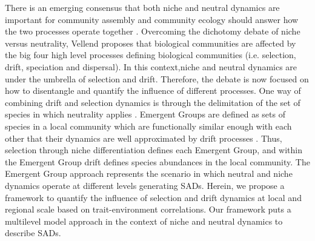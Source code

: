 \documentclass[12pt]{article}
\begin{document}
There is an emerging consensus that both niche and neutral dynamics are important for community assembly \citep{Vellend2014} and community ecology should answer how the two processes operate together \citep{Gravel2006, Herault2007, Ovaskainen2017}. Overcoming the dichotomy debate of niche versus neutrality, Vellend proposes that biological communities are affected by the big four high level processes defining biological communities (i.e. selection, drift, speciation and dispersal). In this context,niche and neutral dynamics are under the umbrella of selection and drift. Therefore, the debate is now focused on how to disentangle and quantify the influence of different processes. %
One way of combining drift and selection dynamics is through the delimitation 
of the set of species in which neutrality applies \citep{Tilman2004, Scheffer2006, Herault2007, Holt2007}. Emergent Groups are defined as sets of species in a local community which are functionally similar enough with each other that their dynamics are well approximated by drift processes \citep{Herault2007}. Thus, selection through niche differentiation defines each Emergent Group, and within the Emergent Group drift defines species abundances in the local community. The Emergent Group approach represents the scenario in which neutral and niche dynamics operate at different levels generating SADs. Herein, we propose a framework to quantify the influence of selection and drift dynamics at local and regional scale based on trait-environment correlations. Our framework puts a multilevel model approach \citep{Pollock2012, Jamil2013, Jamil2013a, Miller2019, TerBraak2019} 
in the context of niche and neutral dynamics to describe SADs. 
\end{document}

